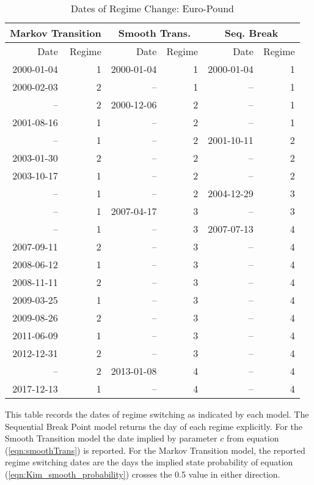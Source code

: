 \begin{table}
	\centering
	\begin{threeparttable}
		\caption{Dates of Regime Change: Euro-Pound}	\label{tbl:regime_changes_euro_pound}
		\begin{tabular}[c]{r r | r r | r r}
			\midrule
			\multicolumn{2}{c}{Markov Transition} & \multicolumn{2}{c}{Smooth Trans.} & \multicolumn{2}{c}{Seq. Break} \\
			\midrule
			Date & Regime & Date & Regime & Date & Regime \\
			\midrule
			2000-01-04 &  1 & 2000-01-04 &  1 & 2000-01-04 &  1 \\
			2000-02-03 &  2 &         -- &  1 &         -- &  1 \\
					-- &  2 & 2000-12-06 &  2 &         -- &  1 \\
			2001-08-16 &  1 &         -- &  2 &         -- &  1 \\
					-- &  1 &         -- &  2 & 2001-10-11 &  2 \\
			2003-01-30 &  2 &         -- &  2 &         -- &  2 \\
			2003-10-17 &  1 &         -- &  2 &         -- &  2 \\
					-- &  1 &         -- &  2 & 2004-12-29 &  3 \\
					-- &  1 & 2007-04-17 &  3 &         -- &  3 \\
					-- &  1 &         -- &  3 & 2007-07-13 &  4 \\				
			2007-09-11 &  2 &         -- &  3 &         -- &  4 \\
			2008-06-12 &  1 &         -- &  3 &         -- &  4 \\
			2008-11-11 &  2 &         -- &  3 &         -- &  4 \\
			2009-03-25 &  1 &         -- &  3 &         -- &  4 \\
			2009-08-26 &  2 &         -- &  3 &         -- &  4 \\
			2011-06-09 &  1 &         -- &  3 &         -- &  4 \\
			2012-12-31 &  2 &         -- &  3 &         -- &  4 \\
					-- &  2 & 2013-01-08 &  4 &         -- &  4 \\
			2017-12-13 &  1 &         -- &  4 &         -- &  4 \\
			\hline
		\end{tabular}
		\begin{tablenotes}
			\item{\footnotesize This table records the dates of regime switching as indicated by each model. The Sequential Break Point model returns the day of each regime explicitly. For the Smooth Transition model the date implied by parameter $c$ from equation (\ref{eqn:smoothTrans}) is reported. For the Markov Transition model, the reported regime switching dates are the days the implied state probability of equation (\ref{eqn:Kim_smooth_probability}) crosses the 0.5 value in either direction.}
		\end{tablenotes}
	\end{threeparttable}
\end{table}


